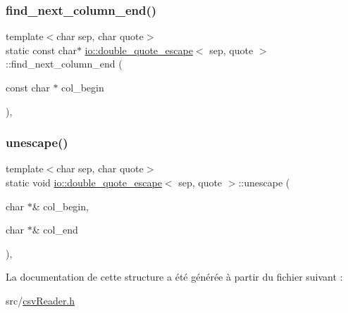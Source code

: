 \subsubsection{\texorpdfstring{find\+\_\+next\+\_\+column\+\_\+end()}{find\_next\_column\_end()}}
{\footnotesize\ttfamily template$<$char sep, char quote$>$ \\
static const char$\ast$ \hyperlink{structio_1_1double__quote__escape}{io\+::double\+\_\+quote\+\_\+escape}$<$ sep, quote $>$\+::find\+\_\+next\+\_\+column\+\_\+end (\begin{DoxyParamCaption}\item[{const char $\ast$}]{col\+\_\+begin }\end{DoxyParamCaption})\hspace{0.3cm}{\ttfamily [inline]}, {\ttfamily [static]}}

\mbox{\label{structio_1_1double__quote__escape_a02e332751916fbdb7b35c238d690e580}} 
\subsubsection{\texorpdfstring{unescape()}{unescape()}}
{\footnotesize\ttfamily template$<$char sep, char quote$>$ \\
static void \hyperlink{structio_1_1double__quote__escape}{io\+::double\+\_\+quote\+\_\+escape}$<$ sep, quote $>$\+::unescape (\begin{DoxyParamCaption}\item[{char $\ast$\&}]{col\+\_\+begin,  }\item[{char $\ast$\&}]{col\+\_\+end }\end{DoxyParamCaption})\hspace{0.3cm}{\ttfamily [inline]}, {\ttfamily [static]}}



La documentation de cette structure a été générée à partir du fichier suivant \+:\begin{DoxyCompactItemize}
\item 
src/\hyperlink{csvReader_8h}{csv\+Reader.\+h}\end{DoxyCompactItemize}
